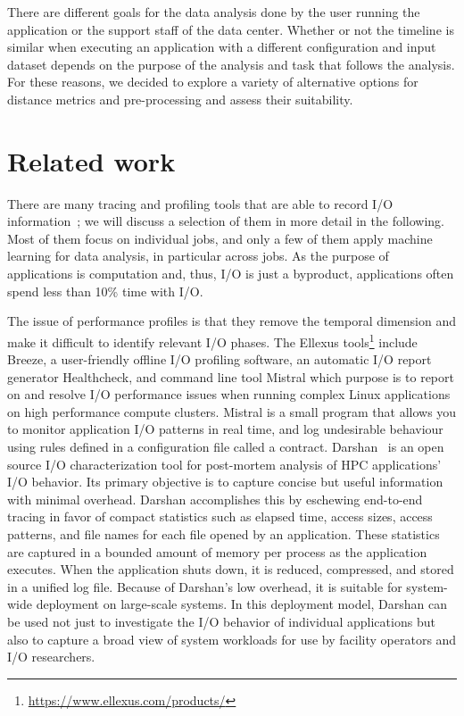 \documentclass[]{llncs}
\begin{document}
There are different goals for the data analysis done by the user running the application or the support staff of the data center.
Whether or not the timeline is similar when executing an application with a different configuration and input dataset depends on the purpose of the analysis and task that follows the analysis.
For these reasons, we decided to explore a variety of alternative options for distance metrics and pre-processing and assess their suitability.


\section{Related work}
There are many tracing and profiling tools that are able to record I/O information~\cite{TFAPIKBBCF19}; we will discuss a selection of them in more detail in the following.
Most of them focus on individual jobs, and only a few of them apply machine learning for data analysis, in particular across jobs. 
As the purpose of applications is computation and, thus, I/O is just a byproduct, applications often spend less than 10\% time with I/O.

The issue of performance profiles is that they remove the temporal dimension and make it difficult to identify relevant I/O phases.
The Ellexus tools\footnote{\url{https://www.ellexus.com/products/}} include Breeze, a user-friendly offline I/O profiling software, an automatic I/O report generator Healthcheck, and command line tool Mistral which purpose is to report on and resolve I/O performance issues when running complex Linux applications on high performance compute clusters.
Mistral is a small program that allows you to monitor application I/O patterns in real time, and log undesirable behaviour using rules defined in a configuration file called a contract.
Darshan~\cite{carns2011understanding-toc,hpcdarshan} is an open source I/O characterization tool for post-mortem analysis of HPC applications' I/O behavior.
Its primary objective is to capture concise but useful information with minimal overhead.
Darshan accomplishes this by eschewing end-to-end tracing in favor of compact statistics such as elapsed time, access sizes, access patterns, and file names for each file opened by an application.
These statistics are captured in a bounded amount of memory per process as the application executes.
When the application shuts down, it is reduced, compressed, and stored in a unified log file.
Because of Darshan's low overhead, it is suitable for system-wide deployment on large-scale systems.
In this deployment model, Darshan can be used not just to investigate the I/O behavior of individual applications but also to capture a broad view of system workloads for use by facility operators and I/O researchers.
\end{document}
